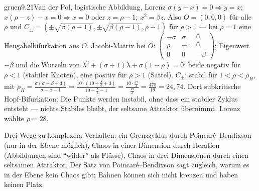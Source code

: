 \begin{loesungkarte}{gruen}{9.21}{Van der Pol, logistische Abbildung, Lorenz}
$\sigma(y - x) = 0\Rightarrow y = x$; $x(\rho - z) - x = 0\Rightarrow x = 0$ oder $z = \rho - 1$; $x^{2} = \beta z$. Also $O = (0, 0, 0)$ für alle $\rho$ und $C_\pm = (\pm\sqrt{\beta(\rho - 1)}, \pm\sqrt{\beta(\rho - 1)}, \rho - 1)$ für $\rho > 1$ --- bei $\rho = 1$ eine Heugabelbifurkation aus $O$. Jacobi-Matrix bei $O$: $\begin{pmatrix}-\sigma&\sigma&0\\\rho&-1&0\\0&0&-\beta\end{pmatrix}$; Eigenwert $-\beta$ und die Wurzeln von $\lambda^{2} + (\sigma + 1)\lambda + \sigma(1 - \rho) = 0$: beide negativ für $\rho < 1$ (stabiler Knoten), eine positiv für $\rho > 1$ (Sattel). $C_\pm$: stabil für $1 < \rho < \rho_H$, mit $\rho_H = \frac{\sigma(\sigma + \beta + 3)}{\sigma - \beta - 1} = \frac{10\cdot(10 + \frac83 + 3)}{10 - \frac83 - 1} = \frac{10\cdot\frac{47}3}{\frac{19}3} = \frac{470}{19} = 24{,}74$. Dort subkritische Hopf-Bifurkation: Die Punkte werden instabil, ohne dass ein stabiler Zyklus entsteht --- nichts Stabiles bleibt, der seltsame Attraktor übernimmt. Lorenz wählte $\rho = 28$.
\begin{mitnehmen}\kastentext
Drei Wege zu komplexem Verhalten: ein Grenzzyklus durch Poincaré--Bendixson (nur in der Ebene möglich), Chaos in einer Dimension durch Iteration (Abbildungen sind \enquote{wilder} als Flüsse), Chaos in drei Dimensionen durch einen seltsamen Attraktor. Der Satz von Poincaré--Bendixson sagt zugleich, warum es in der Ebene kein Chaos gibt: Bahnen können sich nicht kreuzen und haben keinen Platz.
\end{mitnehmen}
\end{loesungkarte}

